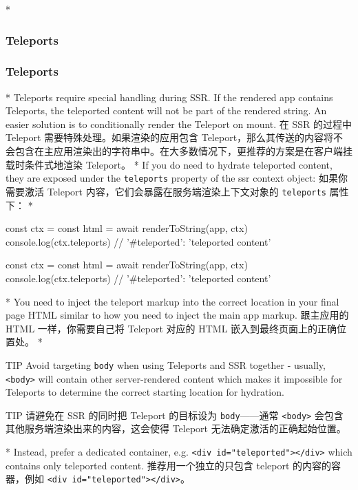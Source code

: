 \begin{paracol}{2} 
  
\switchcolumn[0]*%
\subsubsection{Teleports}
\switchcolumn
\subsubsection{Teleports}
\switchcolumn[0]*%
Teleports require special handling during SSR. If the rendered app
contains Teleports, the teleported content will not be part of the
rendered string. An easier solution is to conditionally render the
Teleport on mount.
\switchcolumn
在 SSR 的过程中 Teleport 需要特殊处理。如果渲染的应用包含
Teleport，那么其传送的内容将不会包含在主应用渲染出的字符串中。在大多数情况下，更推荐的方案是在客户端挂载时条件式地渲染
Teleport。
\switchcolumn[0]*%
If you do need to hydrate teleported content, they are exposed under the
\texttt{teleports} property of the ssr context object:
\switchcolumn
如果你需要激活 Teleport 内容，它们会暴露在服务端渲染上下文对象的
\texttt{teleports} 属性下：
\switchcolumn[0]*%
\begin{codeJs}
const ctx = {}
const html = await renderToString(app, ctx)
console.log(ctx.teleports) // { '#teleported': 'teleported content' }
\end{codeJs}
\switchcolumn
\begin{codeJs}
const ctx = {}
const html = await renderToString(app, ctx)
console.log(ctx.teleports) // { '#teleported': 'teleported content' }
\end{codeJs}
\switchcolumn[0]*%
You need to inject the teleport markup into the correct location in your
final page HTML similar to how you need to inject the main app markup.
\switchcolumn
跟主应用的 HTML 一样，你需要自己将 Teleport 对应的 HTML
嵌入到最终页面上的正确位置处。
\switchcolumn[0]*%
\begin{vueQuote}{TIP}
Avoid targeting \texttt{body} when using Teleports and SSR together -
usually, \texttt{\textless{}body\textgreater{}} will contain other
server-rendered content which makes it impossible for Teleports to
determine the correct starting location for hydration.
\end{vueQuote} 
\switchcolumn
\begin{vueQuote}{TIP}
请避免在 SSR 的同时把 Teleport 的目标设为 \texttt{body}------通常
\texttt{\textless{}body\textgreater{}}
会包含其他服务端渲染出来的内容，这会使得 Teleport
无法确定激活的正确起始位置。
\end{vueQuote} 
\switchcolumn[0]*%
Instead, prefer a dedicated container, e.g.
\texttt{\textless{}div\ id="teleported"\textgreater{}\textless{}/div\textgreater{}}
which contains only teleported content.
\switchcolumn
推荐用一个独立的只包含 teleport 的内容的容器，例如
\texttt{\textless{}div\ id="teleported"\textgreater{}\textless{}/div\textgreater{}}。
\end{paracol}


